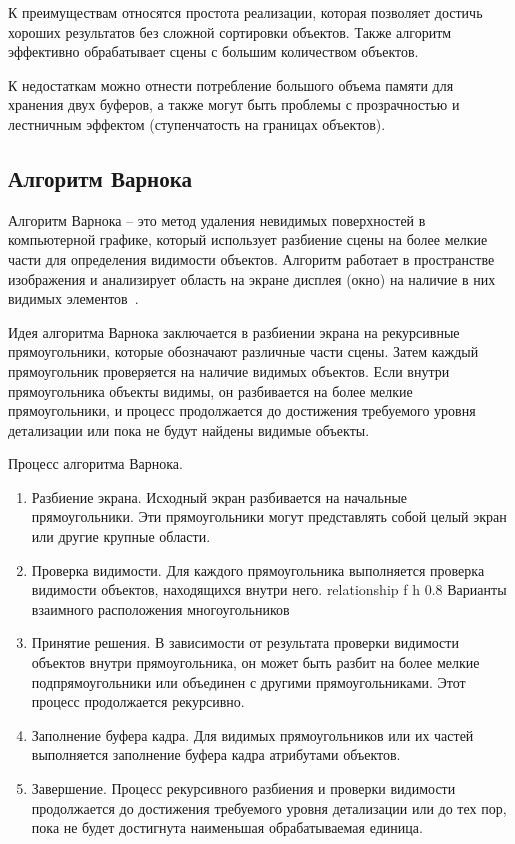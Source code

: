 К преимуществам относятся простота реализации, которая позволяет достичь хороших результатов без сложной сортировки объектов. Также алгоритм эффективно обрабатывает сцены с большим количеством объектов.

К недостаткам можно отнести потребление большого объема памяти для хранения двух буферов, а также могут быть проблемы с прозрачностью и лестничным эффектом (ступенчатость на границах объектов).

\subsection{Алгоритм Варнока}

Алгоритм Варнока -- это метод удаления невидимых поверхностей в компьютерной графике, который использует разбиение сцены на более мелкие части для определения видимости объектов. 
Алгоритм работает в пространстве изображения и анализирует область на экране дисплея (окно) на наличие в них видимых элементов~\cite{delinvis}. 

Идея алгоритма Варнока заключается в разбиении экрана на рекурсивные прямоугольники, которые обозначают различные части сцены. 
Затем каждый прямоугольник проверяется на наличие видимых объектов. 
Если внутри прямоугольника объекты видимы, он разбивается на более мелкие прямоугольники, и процесс продолжается до достижения требуемого уровня детализации или пока не будут найдены видимые объекты.

Процесс алгоритма Варнока.
\begin{enumerate}
    \item Разбиение экрана. 
    Исходный экран разбивается на начальные прямоугольники. 
    Эти прямоугольники могут представлять собой целый экран или другие крупные области.
    \item Проверка видимости. 
    Для каждого прямоугольника выполняется проверка видимости объектов, находящихся внутри него. 
        {relationship}
        {f}
        {h}
        {0.8\textwidth}
        {Варианты взаимного расположения многоугольников~\cite{delinvis}}
    \item Принятие решения. 
    В зависимости от результата проверки видимости объектов внутри прямоугольника, он может быть разбит на более мелкие подпрямоугольники или объединен с другими прямоугольниками. 
    Этот процесс продолжается рекурсивно.
    \item Заполнение буфера кадра. 
    Для видимых прямоугольников или их частей выполняется заполнение буфера кадра атрибутами объектов.
    \item Завершение. 
    Процесс рекурсивного разбиения и проверки видимости продолжается до достижения требуемого уровня детализации или до тех пор, пока не будет достигнута наименьшая обрабатываемая единица.
\end{enumerate}

